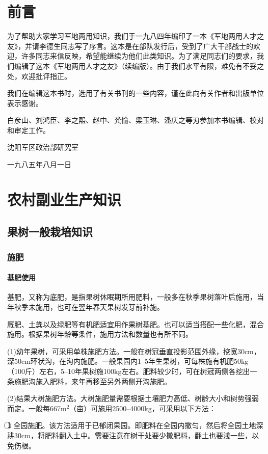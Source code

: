 \documentclass{ctexbook}
\begin{document}
\chapter*{前言}
为了帮助大家学习军地两用知识，我们于一九八四年编印了一本《军地两用人才之友》，并请李德生同志写了序言。这本是在部队发行后，受到了广大干部战士的欢迎，许多同志来信反映，希望能继续为他们此类知识。为了满足同志们的要求，我们编辑了这本《军地两用人才之友》（续编版）。由于我们水平有限，难免有不妥之处，欢迎批评指正。

我们在编辑这本书时，选用了有关书刊的一些内容，谨在此向有关作者和出版单位表示感谢。

白彦山、刘鸿臣、李之熙、赵中、龚愉、梁玉琳、潘庆之等刃参加本书编辑、校对和审定工作。
\begin{flushright}
	沈阳军区政治部研究室
\end{flushright}
\begin{flushright}
	一九八五年八月一日
\end{flushright}
\chapter{农村副业生产知识}
\section{果树一般栽培知识}
\subsection{施肥}
\subsubsection{基肥使用}
基肥，又称为底肥，是指果树休眠期所用肥料，一般多在秋季果树落叶后施用，当年秋季未施用，也可在翌年春天果树发芽前补施。

厩肥、土粪以及绿肥等有机肥适宜用作果树基肥。也可以适当搭配一些化肥，混合施用。根据果树年龄等条件，施用方法和数量也有所不同。

(1)幼年果树，可采用单株施肥方法。一般在树冠垂直投影范围外缘，挖宽30cm，深50cm环状沟，在沟内施肥。一般果园内1--5年生果树，可每株施有机肥50kg（100斤）左右，5--10年果树施100kg左右。肥料较少时，可在树冠两侧各挖出一条施肥沟施入肥料，来年再移至另外两侧开沟施肥。

(2)结果大树施肥方法。大树施肥量需要根据土壤肥力高低、树龄大小和树势强弱而定。一般每667m$^{2}$（亩）可施用2500--4000kg，可采用以下方法：

\textcircled{1} 全园施肥。该方法适用于已郁闭果园。即肥料在全园内撒匀，然后将全园土地深耕30cm，将肥料翻入土中。需要注意在树干处要少撒肥料，翻土也要浅一些，以免伤根。
\end{document}
